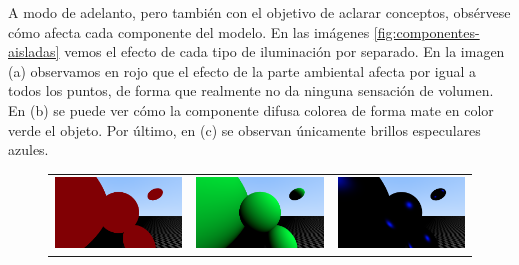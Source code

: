 A modo de adelanto, pero también con el objetivo de aclarar conceptos, obsérvese cómo afecta cada componente del modelo. En las imágenes \ref{fig:componentes-aisladas} vemos el efecto de cada tipo de iluminación por separado. En la imagen (a) observamos en rojo que el efecto de la parte ambiental afecta por igual a todos los puntos, de forma que realmente no da ninguna sensación de volumen. En (b) se puede ver cómo la componente difusa colorea de forma mate en color verde el objeto. Por último, en (c) se observan únicamente brillos especulares azules.

\begin{figure}[ht]
    \centering
    \begin{tabular}{ccc}
      \includegraphics[scale=0.13]{img/C7/solo-ambiental.png} &   \includegraphics[scale=0.13]{img/C7/solo-difusa.png} &   \includegraphics[scale=0.13]{img/C7/solo-especular.png} \\

\end{tabular}
\end{figure}
